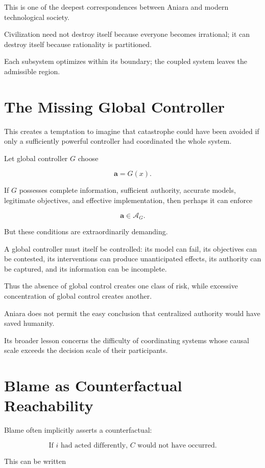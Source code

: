 \documentclass[11pt,oneside]{book}
\theoremstyle{definition}
\theoremstyle{remark}
\newcommand{\A}{\mathcal{A}}
\begin{document}
This is one of the deepest correspondences between Aniara and modern technological society.

Civilization need not destroy itself because everyone becomes irrational; it can destroy itself because rationality is partitioned.

Each subsystem optimizes within its boundary; the coupled system leaves the admissible region.

\section{The Missing Global Controller}

This creates a temptation to imagine that catastrophe could have been avoided if only a sufficiently powerful controller had coordinated the whole system.

Let global controller \(G\) choose

\[
\mathbf a
=
G(x).
\]

If \(G\) possesses complete information, sufficient authority, accurate models, legitimate objectives, and effective implementation, then perhaps it can enforce

\[
\mathbf a\in\A_G.
\]

But these conditions are extraordinarily demanding.

A global controller must itself be controlled: its model can fail, its objectives can be contested, its interventions can produce unanticipated effects, its authority can be captured, and its information can be incomplete.

Thus the absence of global control creates one class of risk, while excessive concentration of global control creates another.

Aniara does not permit the easy conclusion that centralized authority would have saved humanity.

Its broader lesson concerns the difficulty of coordinating systems whose causal scale exceeds the decision scale of their participants.

\section{Blame as Counterfactual Reachability}

Blame often implicitly asserts a counterfactual:

\[
\text{If }i\text{ had acted differently, }C\text{ would not have occurred.}
\]

This can be written
\end{document}
